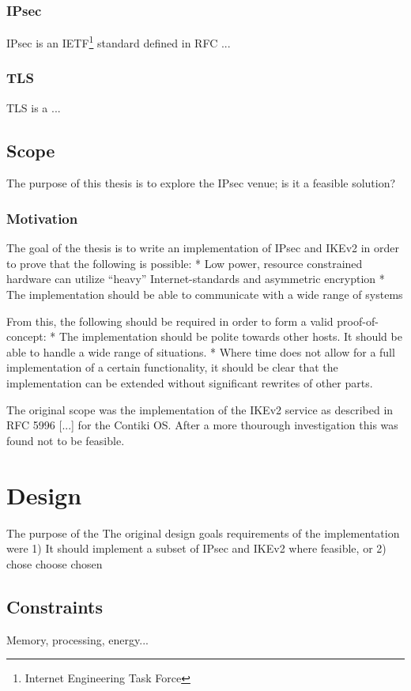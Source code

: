 \documentclass[final,letterpaper,twoside,12pt,twocolumn]{report}
\begin{document}
\subsection{IPsec}
IPsec is an IETF\footnote{Internet Engineering Task Force} standard defined in RFC ...

\subsection{TLS}
TLS is a ...

\section{Scope}

The purpose of this thesis is to explore the IPsec venue; is it a feasible solution?

\subsection{Motivation}

The goal of the thesis is to write an implementation of IPsec and IKEv2 in order to prove that the following is possible:
* Low power, resource constrained hardware can utilize ``heavy'' Internet-standards and asymmetric encryption
* The implementation should be able to communicate with a wide range of systems

From this, the following should be required in order to form a valid proof-of-concept:
* The implementation should be polite towards other hosts. It should be able to handle a wide range of situations.
* Where time does not allow for a full implementation of a certain functionality, it should be clear that the implementation can be extended without significant rewrites of other parts.

The original scope was the implementation of the IKEv2 service as described in RFC 5996 [...] for the Contiki OS. After a more thourough investigation this was found not to be feasible.


\chapter{Design}
The purpose of the
The original design goals requirements of the implementation were
1) It should implement a subset of IPsec and IKEv2 where feasible, or 
2) 
chose
choose
chosen

\section{Constraints}
Memory, processing, energy...
\end{document}
